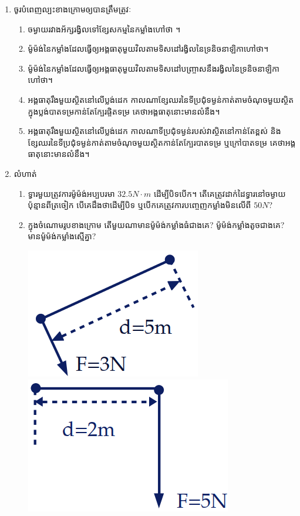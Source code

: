\documentclass{officialexam}
\begin{document}
\begin{enumerate}[I]
\begin{enumerate}[m]
\begin{multicols}{4}
\begin{enumerate}[bk]
				\end{enumerate}
			\end{multicols}
		\end{enumerate}
		\item {\color{khtug}\sffamily ចូរបំពេញល្បះខាងក្រោមឲ្យបានត្រឹមត្រូវៈ}
		\begin{enumerate}[m]
			\item ចម្ងាយរវាងអ័ក្សរង្វិលទៅខ្សែសកម្មនៃកម្លាំងហៅថា \dotfill។
			\item ម៉ូម៉ង់នៃកម្លាំងដែលធ្វើឲ្យអង្គធាតុមួយវិលតាមទិសដៅរង្វិលនៃទ្រនិចនាឡិកាហៅថា\dotfill។
			\item ម៉ូម៉ង់នៃកម្លាំងដែលធ្វើឲ្យអង្គធាតុមួយវិលតាមទិសដៅបញ្រ្ចាសនឹងរង្វិលនៃទ្រនិចនាឡិកាហៅថា\dotfill។
			\item អង្គធាតុរឹងមួយស្ថិតនៅលើប្លង់ដេក កាលណាខ្សែឈរនៃទីប្រជុំទម្ងន់កាត់តាមចំណុចមួយស្ថិតក្នុងប្លង់បាតទម្រកាន់តែក្បែរផ្ចិតទម្រ គេថាអង្គធាតុនោះមានលំនឹង\dotfill។
			\item អង្គធាតុរឹងមួយស្ថិតនៅលើប្លង់ដេក កាលណាទីប្រជុំទម្ងន់របស់វាស្ថិតនៅកាន់តែខ្ពស់ និងខ្សែឈរនៃទីប្រជុំទម្ងន់កាត់តាមចំណុចមួយស្ថិតកាន់តែក្បែរបាតទម្រ ឬក្រៅបាតទម្រ គេថាអង្គធាតុនោះមានលំនឹង\dotfill។
		\end{enumerate}
		\item {\color{khtug}\sffamily លំហាត់}
		\begin{enumerate}[m]
			\item ទ្វារមួយត្រូវការម៉ូម៉ង់អប្បបរមា $32.5N\cdot m$ ដើម្បីបិទបើក។ តើគេត្រូវដាក់ដៃទ្វារនៅចម្ងាយប៉ុន្មានពីត្រចៀក បើគេដឹងថាដើម្បីបិទ ឬបើកគេត្រូវការបញ្ចេញកម្លាំងមិនលើពី $50N$?
			\item ក្នុងចំណោមរូបខាងក្រោម តើមួយណាមានម៉ូម៉ង់កម្លាំងធំជាងគេ? ម៉ូម៉ង់កម្លាំងតូចជាងគេ? មានម៉ូម៉ង់កម្លាំងស្មើគ្នា?
			\begin{multicols}{2}
				\includegraphics[scale=0.4]{09}
				\includegraphics[scale=0.4]{10}

\end{multicols}
\end{enumerate}
\end{enumerate}
\end{document}
